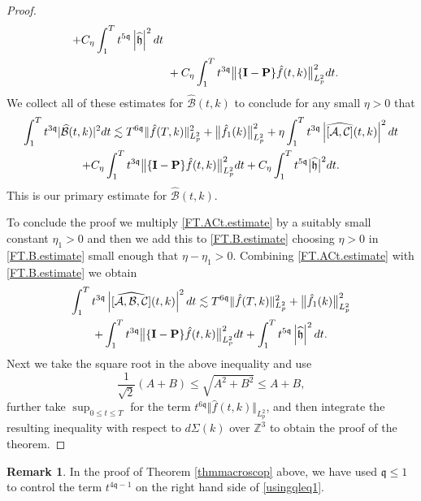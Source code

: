 \documentclass[reqno]{amsart}
\newcommand{\pv}{p}
\def\norm#1{\big\Vert#1\big\Vert}
\newcommand{\qq}{\mathfrak{q}}
\newcommand{\tTq}{t^{3\qq}}
\newcommand{\micro}{{\bf \{I- P\}}}
\newcommand{\Z}{\mathbb{Z}}
\theoremstyle{definition}
\newtheorem{remark}[theorem]{Remark}
\numberwithin{equation}{section}
\numberwithin{theorem}{section}
\begin{document}
\begin{proof}
\begin{align*}
  +C_\eta\int_1^{T} t^{5\qq}\left| \widehat{\mathfrak{h}}\right|^2dt
  \\
&~
+C_\eta\int_1^{T} \tTq\norm{\micro \hat{f}(t,k)}_{L^2_{\pv}}^2dt.
\end{align*}
We collect all of these estimates for $\widehat{\mathcal{B}}(t,k)$ to conclude for any small $\eta>0$ that 
\begin{multline}\label{FT.B.estimate}
\int_1^{T} \tTq|\widehat{\mathcal{B}}(t,k)|^2  dt
\lesssim
 T^{6\qq}\Vert \hat{f}(T,k)\Vert_{L^2_{\pv}}^2+\norm{ \hat{f}_1(k)}_{L^2_{\pv}}^2
 +
\eta \int^{T}_{1} \tTq \left|\widehat{[\mathcal{A},\mathcal{C}]}(t,k)\right|^2 dt
 \\
+C_\eta\int_1^{T} \tTq\norm{\micro \hat{f}(t,k)}_{L^2_{\pv}}^2dt
+C_\eta\int_1^{T} t^{5\qq}\big|\widehat{\mathfrak{h}}\big|^2dt.
\end{multline}
This is our primary estimate for $\widehat{\mathcal{B}}(t,k)$.



To conclude the proof we multiply \eqref{FT.ACt.estimate} by a suitably small constant $\eta_1>0$ and then we add this to \eqref{FT.B.estimate} choosing $\eta>0$ in \eqref{FT.B.estimate} small enough that $\eta-\eta_1>0$.  Combining \eqref{FT.ACt.estimate} with \eqref{FT.B.estimate} we obtain
\begin{multline*}
    \int^{T}_{1} \tTq \left|\widehat{[\mathcal{A},\mathcal{B},\mathcal{C}]}(t,k)\right|^2 dt
    \lesssim
     T^{6\qq}\Vert \hat{f}(T,k)\Vert_{L^2_{\pv}}^2+\norm{ \hat{f}_1(k)}_{L^2_{\pv}}^2
 \\
+\int_1^{T} \tTq\norm{\micro \hat{f}(t,k)}_{L^2_{\pv}}^2dt
+\int_1^{T} t^{5\qq}\left| \widehat{\mathfrak{h}}\right|^2dt.
\end{multline*}
Next we take the square root in the above inequality and use 
\begin{equation}
\label{sqrt.ineq}
\frac{1}{\sqrt{2}} (A+B)\leq \sqrt{A^2+B^2}\leq A+B,
\end{equation}
further take $\sup_{0\le t\le T}$ for the term $t^{6\qq}\Vert \hat{f}( t,k)\Vert_{L^2_{\pv}}$,
and then integrate the resulting inequality with respect to $d\Sigma(k)$ over $\Z^3$ to obtain the proof of the theorem.
\end{proof}

\begin{remark}
    In the proof of Theorem \ref{thmmacroscop} above, we have used \(\qq\leq 1\) to control the term \(t^{4\qq -1}\) on the right hand side of \eqref{usingqleq1}. 
\end{remark}
\end{document}
